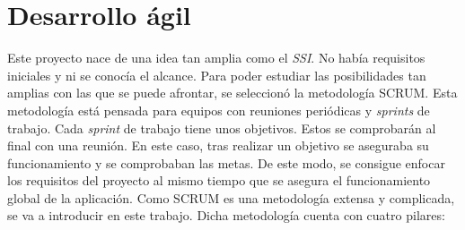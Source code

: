 \section{Desarrollo ágil}
Este proyecto nace de una idea tan amplia como el \textit{SSI}. No había requisitos iniciales y ni se conocía el alcance. Para poder estudiar las posibilidades tan amplias con las que se puede afrontar, se seleccionó la metodología SCRUM. Esta metodología está pensada para equipos con reuniones periódicas y \textit{sprints} de trabajo. Cada \textit{sprint} de trabajo tiene unos objetivos. Estos se comprobarán al final con una reunión.
En este caso, tras realizar un objetivo se aseguraba su funcionamiento y se comprobaban las metas. De este modo, se consigue enfocar los requisitos del proyecto al mismo tiempo que se asegura el funcionamiento global de la aplicación.
Como SCRUM es una metodología extensa y complicada, se va a introducir en este trabajo. Dicha metodología cuenta con cuatro pilares:
